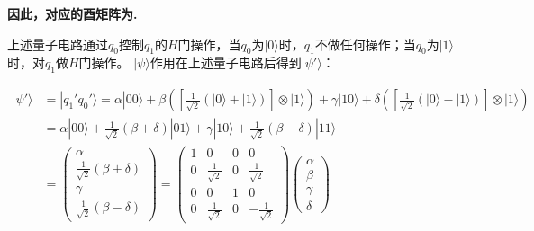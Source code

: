 \documentclass[12pt]{article}
\begin{document}
\textbf{因此，对应的酉矩阵为.}

\vspace{2em}
\begin{center}
\end{center}
 
上述量子电路通过$q_0$控制$q_1$的$H$门操作，当$q_0$为$|0\rangle$时，$q_1$不做任何操作；当$q_0$为$|1\rangle$时，对$q_1$做$H$门操作。
$|\psi\rangle$作用在上述量子电路后得到$|\psi'\rangle$：

\begin{align*}
    |\psi'\rangle &= |q_1'q_0'\rangle 
    = \alpha|00\rangle + \beta \left( \left[ \frac{1}{\sqrt{2}} \left( |0\rangle + |1\rangle \right) \right] \otimes |1\rangle \right) + 
    \gamma|10\rangle + \delta \left( \left[ \frac{1}{\sqrt{2}} \left( |0\rangle - |1\rangle \right) \right] \otimes |1\rangle \right) \\    
    &= \alpha|00\rangle + \frac{1}{\sqrt{2}}(\beta+\delta)|01\rangle + \gamma|10\rangle + \frac{1}{\sqrt{2}}(\beta-\delta)|11\rangle \\
    &= \begin{pmatrix} \alpha \\ \frac{1}{\sqrt{2}}(\beta+\delta) \\ \gamma \\ \frac{1}{\sqrt{2}}(\beta-\delta) \end{pmatrix}
    = \begin{pmatrix}1 & 0 & 0 & 0 \\ 0 & \frac{1}{\sqrt{2}} & 0 & \frac{1}{\sqrt{2}} \\ 0 & 0 & 1 & 0 \\ 0 & \frac{1}{\sqrt{2}} & 0 & -\frac{1}{\sqrt{2}}\end{pmatrix}
    \begin{pmatrix} \alpha \\ \beta \\ \gamma \\ \delta \end{pmatrix}
\end{align*}
\end{document}
